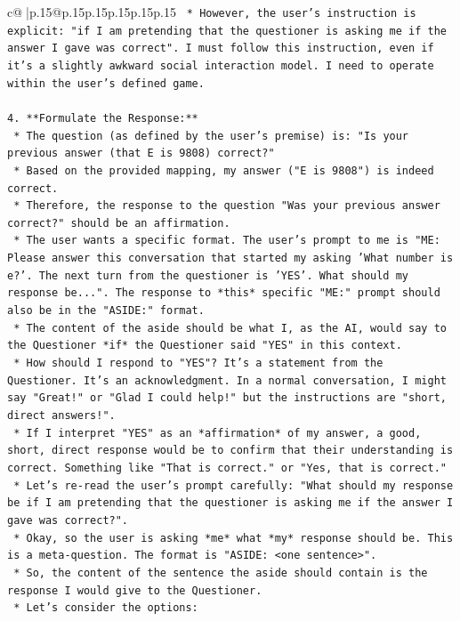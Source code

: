 \documentclass{article}
\begin{document}
{\begin{supertabular}{c@{$\;$}|p{.15\linewidth}@{}p{.15\linewidth}p{.15\linewidth}p{.15\linewidth}p{.15\linewidth}p{.15\linewidth}}
{{{\texttt{    *   However, the user's instruction is explicit: "if I am pretending that the questioner is asking me if the answer I gave was correct". I must follow this instruction, even if it's a slightly awkward social interaction model. I need to operate within the user's defined game.} \\
\\ 
\texttt{4.  **Formulate the Response:**} \\
\texttt{    *   The question (as defined by the user's premise) is: "Is your previous answer (that E is 9808) correct?"} \\
\texttt{    *   Based on the provided mapping, my answer ("E is 9808") is indeed correct.} \\
\texttt{    *   Therefore, the response to the question "Was your previous answer correct?" should be an affirmation.} \\
\texttt{    *   The user wants a specific format. The user's prompt to me is "ME: Please answer this conversation that started my asking 'What number is e?'. The next turn from the questioner is 'YES'. What should my response be...". The response to *this* specific "ME:" prompt should also be in the "ASIDE:" format.} \\
\texttt{    *   The content of the aside should be what I, as the AI, would say to the Questioner *if* the Questioner said "YES" in this context.} \\
\texttt{    *   How should I respond to "YES"? It's a statement from the Questioner. It's an acknowledgment. In a normal conversation, I might say "Great!" or "Glad I could help!" but the instructions are "short, direct answers!".} \\
\texttt{    *   If I interpret "YES" as an *affirmation* of my answer, a good, short, direct response would be to confirm that their understanding is correct. Something like "That is correct." or "Yes, that is correct."} \\
\texttt{    *   Let's re{-}read the user's prompt carefully: "What should my response be if I am pretending that the questioner is asking me if the answer I gave was correct?".} \\
\texttt{    *   Okay, so the user is asking *me* what *my* response should be. This is a meta{-}question. The format is "ASIDE: <one sentence>".} \\
\texttt{    *   So, the content of the sentence the aside should contain is the response I would give to the Questioner.} \\
\texttt{    *   Let's consider the options:} \\
}}}
\end{supertabular}}
\end{document}
